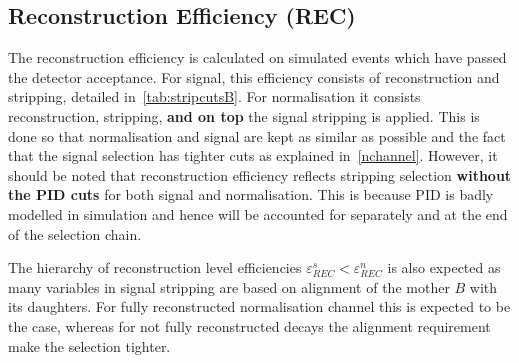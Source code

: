 
\subsection{Reconstruction Efficiency (REC)}
The reconstruction efficiency is calculated on simulated events which have passed the detector acceptance. For \DIFaddbegin {}\DIFaddend signal, this efficiency consists of reconstruction and stripping, detailed in~\autoref{tab:stripcutsB}. For \DIFaddbegin {}\DIFaddend normalisation it consists \DIFdelbegin {}\DIFdelend \DIFaddbegin {}\DIFaddend reconstruction, stripping, \textbf{and on top} the signal stripping is applied. This is done so that \DIFdelbegin {}\DIFdelend \DIFaddbegin {}\DIFaddend normalisation and signal \DIFdelbegin {}\DIFdelend \DIFaddbegin {}\DIFaddend are kept as similar as possible and the fact that the signal selection has tighter cuts as explained in~\autoref{nchannel}. However, it should be noted that \DIFaddbegin {}\DIFaddend reconstruction efficiency reflects \DIFaddbegin {}\DIFaddend stripping selection \textbf{without the PID cuts} for both signal and normalisation. This is because \gls{PID} is badly modelled in simulation and hence will be accounted for separately and at the end of the selection chain.

The hierarchy of reconstruction level efficiencies $\varepsilon^{s}_{REC} < \varepsilon^{n}_{REC}$ is also expected as many variables in \DIFdelbegin {}\DIFdelend \DIFaddbegin {}\DIFaddend signal stripping are based on alignment of the mother $B$ with its daughters. For fully reconstructed normalisation channel this is expected to be the case, whereas for not fully reconstructed decays the alignment requirement make the selection tighter. 

